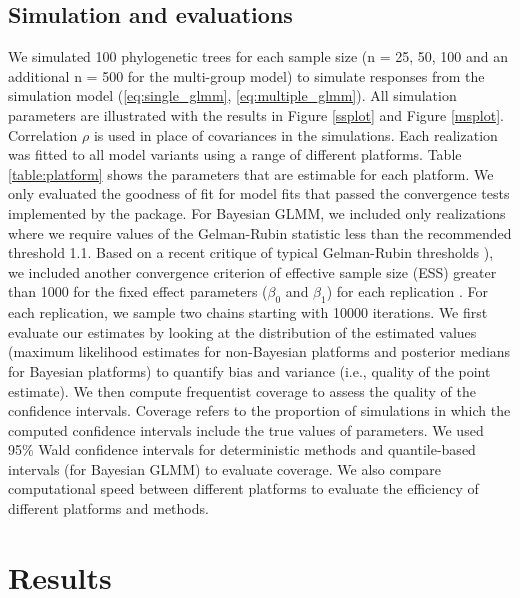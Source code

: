 \documentclass[12pt]{article}
\begin{document}
\subsection*{Simulation and evaluations}
We simulated 100 phylogenetic trees for each sample size (n = 25, 50, 100 and an additional n = 500 for the multi-group model) to simulate responses from the simulation model (\ref{eq:single_glmm}, \ref{eq:multiple_glmm}). All simulation parameters are illustrated with the results in Figure \ref{ssplot} and Figure \ref{msplot}. Correlation $\rho$ is used in place of covariances in the simulations.
Each realization was fitted to all model variants using a range of different platforms.
Table \ref{table:platform} shows the parameters that are estimable for each platform. 
We only evaluated the goodness of fit for model fits that passed the convergence tests implemented by the package.
For Bayesian GLMM, we included only realizations where we require values of the Gelman-Rubin statistic less than the recommended threshold 1.1. Based on a recent critique of typical Gelman-Rubin thresholds \citep{vats2018revisiting}), we included another convergence criterion of effective sample size (ESS) greater than 1000 for the fixed effect parameters ($\beta_{0}$ and $\beta_{1}$) for each replication \citep{vehtari2019rank}. 
For each replication, we sample two chains starting with 10000 iterations. 
We first evaluate our estimates by looking at the distribution of the estimated values (maximum likelihood estimates for non-Bayesian platforms and posterior medians for Bayesian platforms) to quantify bias and variance (i.e., quality of the point estimate).
We then compute frequentist coverage to assess the quality of the confidence intervals.
Coverage refers to the proportion of simulations in which the computed confidence intervals include the true values of parameters.
We used 95\% Wald confidence intervals for deterministic methods and quantile-based intervals (for Bayesian GLMM) to evaluate coverage.
We also compare computational speed between different platforms to evaluate the efficiency of different platforms and methods. 

\section*{Results}
\end{document}

